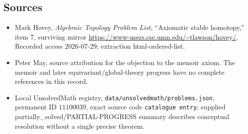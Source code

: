 \documentclass[11pt]{article}
\begin{document}
\subsection{Sources}
\begin{itemize}
\item Mark Hovey, \emph{Algebraic Topology Problem List}, ``Axiomatic stable homotopy,'' item 7, surviving mirror \url{https://www-users.cse.umn.edu/~tlawson/hovey/}. Recorded access 2026-07-29; extraction html-ordered-list.
\item Peter May, source attribution for the objection to the memoir axiom. The memoir and later equivariant/global-theory progress have no complete references in this record.
\item Local UnsolvedMath registry, \texttt{data/unsolvedmath/problems.json}, permanent ID \(11100039\), exact source code \texttt{catalogue entry}; supplied partially\_solved/PARTIAL-PROGRESS summary describes conceptual resolution without a single precise theorem.
\end{itemize}
\end{document}
